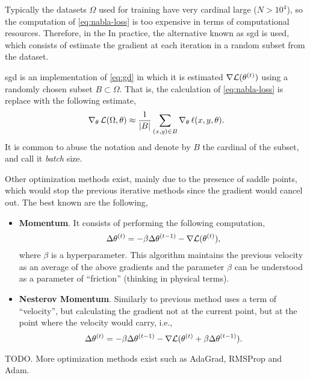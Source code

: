 Typically the datasets \(\Omega\) used for training have very cardinal large
(\(N > 10^4\)), so the computation of \vref{eq:nabla-loss} is too expensive in
terms of computational resources. Therefore, in the In practice, the
alternative known as \gls{sgd} is used, which consists of estimate the gradient
at each iteration in a random subset from the dataset.

\gls{sgd} is an implementation of \vref{eq:gd} in which it is estimated
\(\nabla \mathcal{L} (\theta^{(t)})\) using a randomly chosen subset
\(B \subset \Omega\). That is, the calculation of \vref{eq:nabla-loss} is
replace with the following estimate,
\begin{equation}\label{eq:nabla-loss-sto}
  \nabla_{\theta}\,\mathcal{L}(\Omega, \theta) \approx
  \frac{1}{\lvert B\rvert} \sum_{(x, y) \in B} \nabla_{\theta}\,\ell (x, y, \theta).
\end{equation}
It is common to abuse the notation and denote by \(B\) the cardinal of the
subset, and call it \emph{batch} size.

Other optimization methods exist, mainly due to the presence of saddle points,
which would stop the previous iterative methods since the gradient would cancel
out. The best known are the following,
\begin{itemize}
  \item \textbf{Momentum}. It consists of performing the
  following computation,
  \begin{equation}
    \Delta\theta^{(t)} =
    -\beta\Delta\theta^{(t-1)} -\nabla\mathcal{L}(\theta^{(t)}),
  \end{equation}
  where \(\beta\) is a hyperparameter. This algorithm maintains the previous
  velocity as an average of the above gradients and the parameter \(\beta\) can
  be understood as a parameter of ``friction'' (thinking in physical terms).
  \item \textbf{Nesterov Momentum}. Similarly to
  previous method uses a term of ``velocity'', but calculating the gradient not
  at the current point, but at the point where the velocity would carry, i.e.,
  \begin{equation}
    \Delta\theta^{(t)} =
    -\beta\Delta\theta^{(t-1)} -\nabla\mathcal{L}(\theta^{(t)} +
    \beta\Delta\theta^{(t-1)}).
  \end{equation}
\end{itemize}

TODO. More optimization methods exist such as AdaGrad, RMSProp and Adam.

